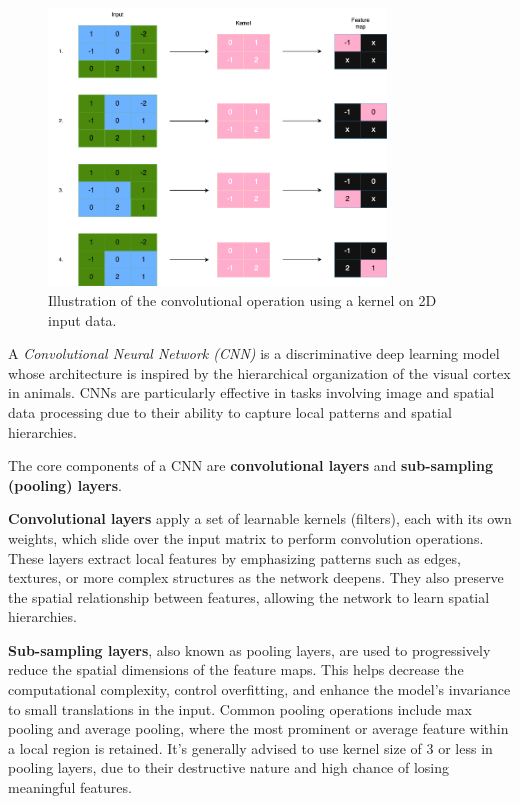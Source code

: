 \begin{figure}[htbp]
  \centering
  \includegraphics[width=0.8\textwidth]{Images/convolutional_operation.png}
  \caption{Illustration of the convolutional operation using a kernel on 2D input data.}
  \label{fig:convolution-diagram}
\end{figure}

\begin{definition}
  A \textit{Convolutional Neural Network (CNN)} \autocite{oshea2015introductionconvolutionalneuralnetworks} \autocite{jmse9040397} \autocite{LIU201711} is a discriminative deep learning model whose architecture is inspired by the hierarchical organization of the visual cortex in animals. CNNs are particularly effective in tasks involving image and spatial data processing due to their ability to capture local patterns and spatial hierarchies.

  The core components of a CNN are \textbf{convolutional layers} and \textbf{sub-sampling (pooling) layers}.

  \textbf{Convolutional layers} apply a set of learnable kernels (filters), each with its own weights, which slide over the input matrix to perform convolution operations. These layers extract local features by emphasizing patterns such as edges, textures, or more complex structures as the network deepens. They also preserve the spatial relationship between features, allowing the network to learn spatial hierarchies.

  \textbf{Sub-sampling layers}, also known as pooling layers, are used to progressively reduce the spatial dimensions of the feature maps. This helps decrease the computational complexity, control overfitting, and enhance the model’s invariance to small translations in the input. Common pooling operations include max pooling and average pooling, where the most prominent or average feature within a local region is retained. It's generally advised to use kernel size of 3 or less in pooling layers, due to their destructive nature and high chance of losing meaningful features.
\end{definition}

